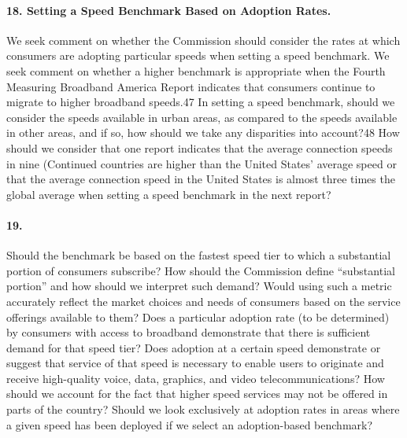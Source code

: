 \paragraph{18. Setting a Speed Benchmark Based on Adoption Rates.} We seek comment on whether the Commission should consider the rates at which consumers are adopting particular speeds when setting a speed benchmark. We seek comment on whether a higher benchmark is appropriate when the Fourth Measuring Broadband America Report indicates that consumers continue to migrate to higher broadband speeds.47
In setting a speed benchmark, should we consider the speeds available in urban areas, as compared to the speeds available in other areas, and if so, how should we take any disparities into account?48
How should we consider that one report indicates that the average connection speeds in nine (Continued
countries are higher than the United States’ average speed or that the average connection speed in the United States is almost three times the global average when setting a speed benchmark in the next report?

\paragraph{19. } Should the benchmark be based on the fastest speed tier to which a substantial portion of
consumers subscribe? How should the Commission define ``substantial portion'' and how should we interpret such demand? Would using such a metric accurately reflect the market choices and needs of consumers based on the service offerings available to them? Does a particular adoption rate (to be determined) by consumers with access to broadband demonstrate that there is sufficient demand for that speed tier? Does adoption at a certain speed demonstrate or suggest that service of that speed is necessary to enable users to originate and receive high-quality voice, data, graphics, and video telecommunications? How should we account for the fact that higher speed services may not be offered in parts of the country? Should we look exclusively at adoption rates in areas where a given speed has been deployed if we select an adoption-based benchmark?

